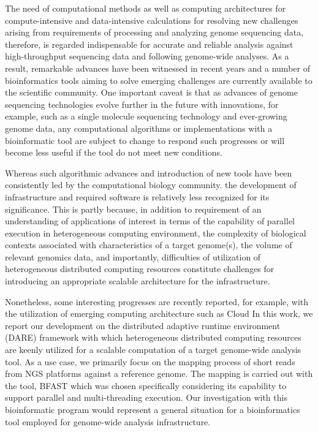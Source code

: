 \documentclass{acm_proc_article-sp}
\begin{document}
The need of computational methods as well as computing architectures for compute-intensive and data-intensive calculations for resolving new challenges arising from requirements of processing and analyzing genome sequencing data, therefore, is regarded indispensable for accurate and reliable analysis against high-throughput sequencing data and following genome-wide analyses.  As a result, remarkable advances have been witnessed in recent years and a number of bioinformatics tools aiming to solve emerging challenges are currently available to the scientific community\cite{trapnell2009,bfast2009,scheibye-alsing2009,pepke2009,samtools}.  One important caveat is that as advances of genome sequencing technologies evolve further in the future with innovations, for example, such as a single molecule sequencing technology and ever-growing genome data, any computational algorithms or implementations with a bioinformatic tool are subject to change to respond such progresses or will become less useful if the tool do not meet new conditions. 

Whereas such algorithmic advances and introduction of new tools have been consistently led by the computational biology community. the development of infrastructure and required software is relatively less recognized for its significance.  This is partly because, in addition to requirement of an understanding of applications of interest in terms of the capability of parallel execution in heterogeneous computing environment, the complexity of biological contexts associated with characteristics of a target genome(s), the volume of relevant genomics data, and importantly, difficulties of utilization of heterogeneous distributed computing resources constitute challenges for introducing an appropriate scalable architecture for the infrastructure.

Nonetheless, some interesting progresses are recently reported, for example, with the utilization of emerging computing architecture such as Cloud\cite{taylor2010}  In this work, we report our development on the distributed adaptive runtime environment (DARE) framework with which heterogeneous distributed computing resources are keenly utilized for a scalable computation of a target genome-wide analysis tool.  As a use case, we primarily focus on the mapping process of short reads from NGS platforms against a reference genome.  The mapping is carried out with the tool, BFAST\cite{bfast2009, bfast2009b} which was chosen specifically considering its capability to support parallel and multi-threading execution.  Our investigation with this bioinformatic program would represent a general situation for a bioinformatics tool employed for genome-wide analysis infrastructure.
\end{document}
